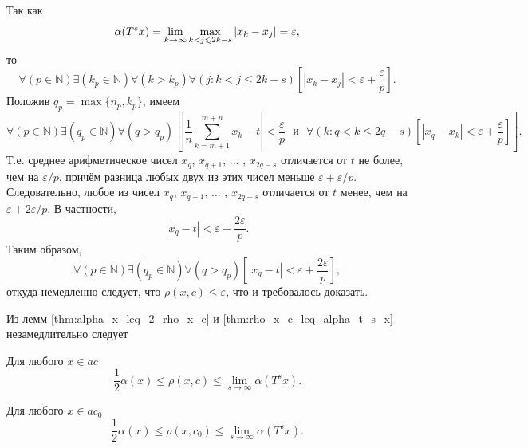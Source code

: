 Так как
\begin{equation}
	\alpha(T^s x) = \varlimsup_{k\to\infty} \max_{k<j\leq 2k-s} |x_k-x_j| = \varepsilon
	,
\end{equation}
то
\begin{equation}
	\forall(p\in\mathbb{N})
	\exists(k_p \in\mathbb{N})\forall(k>k_p)
	\forall(j: k< j \leq 2k-s)
	\left[
		|x_k - x_j|<\varepsilon + \frac{\varepsilon}{p}
	\right]
	.
\end{equation}
Положив $q_p = \max\{n_p, k_p\}$, имеем
\begin{equation*}
	\forall(p\in\mathbb{N})
	\exists(q_p \in\mathbb{N})
	\forall(q>q_p)
	\left[
		\left|
			\frac{1}{n}\sum_{k=m+1}^{m+n} x_k
			-t
		\right|
		<\frac{\varepsilon}{p}
		\mbox{~~и~~}
		\forall(k:q<k \leq 2q-s)
		\left[
			|x_q - x_k|<\varepsilon + \frac{\varepsilon}{p}
		\right]
	\right]
	.
\end{equation*}
Т.е. среднее арифметическое чисел $x_q$, $x_{q+1}$, ... , $x_{2q-s}$ отличается от $t$
не более, чем на $\varepsilon/p$, причём разница любых двух из этих чисел меньше $\varepsilon + \varepsilon/p$.
Следовательно, любое из чисел $x_q$, $x_{q+1}$, ... , $x_{2q-s}$
отличается от $t$ менее, чем на $\varepsilon + 2\varepsilon/p$.
В частности,
\begin{equation}
	|x_q - t| < \varepsilon + \frac{2\varepsilon}{p}
	.
\end{equation}
Таким образом,
\begin{equation}
	\forall(p\in\mathbb{N})
	\exists(q_p \in\mathbb{N})
	\forall(q>q_p)
	\left[
		|x_q - t| < \varepsilon + \frac{2\varepsilon}{p}
	\right]
	,
\end{equation}
откуда немедленно следует, что $\rho(x,c) \leq \varepsilon$,
что и требовалось доказать.

Из лемм \ref{thm:alpha_x_leq_2_rho_x_c} и \ref{thm:rho_x_c_leq_alpha_t_s_x}
незамедлительно следует
\begin{theorem}
\label{thm:rho_x_c_leq_alpha_t_s_x_united}
	Для любого $x\in ac$
	\begin{equation}
		\frac{1}{2} \alpha(x) \leq \rho(x,c)\leq \lim_{s\to\infty} \alpha(T^s x)
		.
	\end{equation}
\end{theorem}

\begin{corollary}
	Для любого $x\in ac_0$
	\begin{equation}
		\frac{1}{2} \alpha(x) \leq \rho(x,c_0)\leq \lim_{s\to\infty} \alpha(T^s x)
		.
	\end{equation}
\end{corollary}

